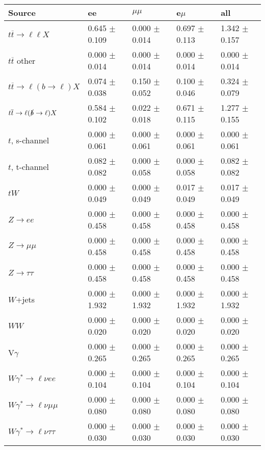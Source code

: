 \begin{tabular}{l | l l l l}
\hline\hline
 Source  &  ee  &  $\mu\mu$  &  e$\mu$  &  all \\
\hline
$t\overline{t}\rightarrow \ell\ell X$ &  0.645 $\pm$  0.109 &  0.000 $\pm$  0.014 &  0.697 $\pm$  0.113 &  1.342 $\pm$  0.157\\
$t\overline{t}$ other &  0.000 $\pm$  0.014 &  0.000 $\pm$  0.014 &  0.000 $\pm$  0.014 &  0.000 $\pm$  0.014\\
$t\overline{t}\rightarrow \ell(b\rightarrow \ell)X$ &  0.074 $\pm$  0.038 &  0.150 $\pm$  0.052 &  0.100 $\pm$  0.046 &  0.324 $\pm$  0.079\\
$t\overline{t}\rightarrow \ell(\slashed{b}\rightarrow \ell)X$ &  0.584 $\pm$  0.102 &  0.022 $\pm$  0.018 &  0.671 $\pm$  0.115 &  1.277 $\pm$  0.155\\
\hline
$t$, s-channel &  0.000 $\pm$  0.061 &  0.000 $\pm$  0.061 &  0.000 $\pm$  0.061 &  0.000 $\pm$  0.061\\
$t$, t-channel &  0.082 $\pm$  0.082 &  0.000 $\pm$  0.058 &  0.000 $\pm$  0.058 &  0.082 $\pm$  0.082\\
$tW$ &  0.000 $\pm$  0.049 &  0.000 $\pm$  0.049 &  0.017 $\pm$  0.049 &  0.017 $\pm$  0.049\\
\hline
$Z\rightarrow ee$ &  0.000 $\pm$  0.458 &  0.000 $\pm$  0.458 &  0.000 $\pm$  0.458 &  0.000 $\pm$  0.458\\
$Z\rightarrow\mu\mu$ &  0.000 $\pm$  0.458 &  0.000 $\pm$  0.458 &  0.000 $\pm$  0.458 &  0.000 $\pm$  0.458\\
$Z\rightarrow\tau\tau$ &  0.000 $\pm$  0.458 &  0.000 $\pm$  0.458 &  0.000 $\pm$  0.458 &  0.000 $\pm$  0.458\\
$W$+jets &  0.000 $\pm$  1.932 &  0.000 $\pm$  1.932 &  0.000 $\pm$  1.932 &  0.000 $\pm$  1.932\\
$WW$ &  0.000 $\pm$  0.020 &  0.000 $\pm$  0.020 &  0.000 $\pm$  0.020 &  0.000 $\pm$  0.020\\
\hline
V$\gamma$ &  0.000 $\pm$  0.265 &  0.000 $\pm$  0.265 &  0.000 $\pm$  0.265 &  0.000 $\pm$  0.265\\
$W\gamma^{*}\rightarrow\ell\nu e e$ &  0.000 $\pm$  0.104 &  0.000 $\pm$  0.104 &  0.000 $\pm$  0.104 &  0.000 $\pm$  0.104\\
$W\gamma^{*}\rightarrow\ell\nu\mu\mu$ &  0.000 $\pm$  0.080 &  0.000 $\pm$  0.080 &  0.000 $\pm$  0.080 &  0.000 $\pm$  0.080\\
$W\gamma^{*}\rightarrow\ell\nu\tau\tau$ &  0.000 $\pm$  0.030 &  0.000 $\pm$  0.030 &  0.000 $\pm$  0.030 &  0.000 $\pm$  0.030\\

\end{tabular}
